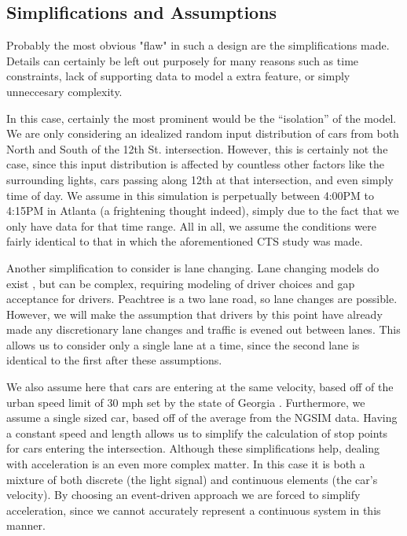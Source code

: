 \documentclass[a4paper,12pt]{article}
\begin{document}
\subsection{Simplifications and Assumptions}
Probably the most obvious "flaw" in such a design are the simplifications made. Details can certainly be left out
purposely for many reasons such as time constraints, lack of supporting data to model a extra feature, or simply
unneccesary complexity.

In this case, certainly the most prominent would be the ``isolation'' of the model. We are only considering an
idealized random input distribution of cars from both North and South of the 12th St. intersection. However, this is
certainly not the case, since this input distribution is affected by countless other factors like the surrounding
lights, cars passing along 12th at that intersection, and even simply time of day. We assume in this simulation is
perpetually between 4:00PM to 4:15PM in Atlanta (a frightening thought indeed), simply due to the fact that we only
have data for that time range. All in all, we assume the conditions were fairly identical to that in which the 
aforementioned CTS study was made.

Another simplification to consider is lane changing. Lane changing models do exist \cite{lanechanging} \cite{lanechanging2},
but can be complex, requiring modeling of driver choices and gap acceptance for drivers. Peachtree is a two lane road,
so lane changes are possible. However, we will make the assumption that drivers by this point have already made any
discretionary lane changes and traffic is evened out between lanes. This allows us to consider only a single lane at a
time, since the second lane is identical to the first after these assumptions.

We also assume here that cars are entering at the same velocity, based off of the urban speed limit of 30 mph set by
the state of Georgia \cite{gacode}. Furthermore, we assume a single sized car, based off of the average from the NGSIM data.
Having a constant speed and length allows us to simplify the calculation of stop points for cars entering the
intersection. Although these simplifications help, dealing with acceleration is an even more complex matter. In this
case it is both a mixture of both discrete (the light signal) and continuous elements (the car's velocity). By choosing
an event-driven approach we are forced to simplify acceleration, since we cannot accurately represent a continuous
system in this manner.
\end{document}
